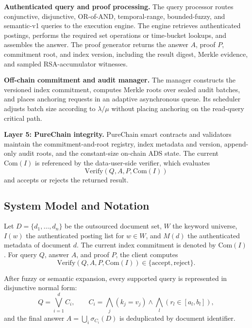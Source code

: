 \documentclass[journal]{IEEEtran}
\theoremstyle{tight}
\theoremstyle{remark}
\theoremstyle{plain}
\begin{document}
\textbf{Authenticated query and proof processing.}
The query processor routes conjunctive, disjunctive, OR-of-AND, temporal-range, bounded-fuzzy, and semantic-v1 queries to the execution engine. The engine retrieves authenticated postings, performs the required set operations or time-bucket lookups, and assembles the answer. The proof generator returns the answer \(A\), proof \(P\), commitment root, and index version, including the result digest, Merkle evidence, and sampled RSA-accumulator witnesses.

\textbf{Off-chain commitment and audit manager.}
The manager constructs the versioned index commitment, computes Merkle roots over sealed audit batches, and places anchoring requests in an adaptive asynchronous queue. Its scheduler adjusts batch size according to \(\lambda/\mu\) without placing anchoring on the read-query critical path.

\textbf{Layer 5: PureChain integrity.}
PureChain smart contracts and validators maintain the commitment-and-root registry, index metadata and version, append-only audit roots, and the constant-size on-chain ADS state. The current \(\mathrm{Com}(I)\) is referenced by the data-user-side verifier, which evaluates
\[
\mathrm{Verify}(Q,A,P,\mathrm{Com}(I))
\]
and accepts or rejects the returned result.

\subsection{System Model and Notation}
\label{3B}

Let \(D=\{d_1,\ldots,d_n\}\) be the outsourced document set, \(W\) the keyword universe, \(I(w)\) the authenticated posting list for \(w\in W\), and \(M(d)\) the authenticated metadata of document \(d\). The current index commitment is denoted by \(\mathrm{Com}(I)\). For query \(Q\), answer \(A\), and proof \(P\), the client computes
\begin{equation}
\mathrm{Verify}(Q,A,P,\mathrm{Com}(I))
\in\{\mathrm{accept},\mathrm{reject}\}.
\end{equation}

After fuzzy or semantic expansion, every supported query is represented in disjunctive normal form:
\begin{equation}
Q=\bigvee_{i=1}^{d}C_i,\qquad
C_i=\bigwedge_j(k_j=v_j)\wedge
\bigwedge_l(r_l\in[a_l,b_l]),
\label{eq:dnf}
\end{equation}
and the final answer \(A=\bigcup_i\sigma_{C_i}(D)\) is deduplicated by document identifier.
\end{document}
